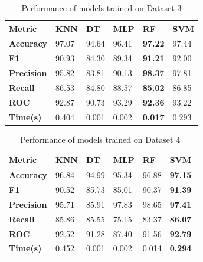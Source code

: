 \begin{table}[H]
  \centering
  \caption{Performance of models trained on Dataset 3}\label{tab:performance_of_models_trained_on_dataset_3}
  \begin{tabular}{|p{5em}|C{3em}|C{3em}|C{3em}|C{3em}|C{3em}|}
    \hline
    \textbf{Metric}    & \textbf{KNN} & \textbf{DT} & \textbf{MLP} & \textbf{RF}    & \textbf{SVM} \\
    \hline
    \textbf{Accuracy}  & 97.07        & 94.64       & 96.41        & \textbf{97.22} & 97.44        \\
    \textbf{F1}        & 90.93        & 84.30       & 89.34        & \textbf{91.21} & 92.00        \\
    \textbf{Precision} & 95.82        & 83.81       & 90.13        & \textbf{98.37} & 97.81        \\
    \textbf{Recall}    & 86.53        & 84.80       & 88.57        & \textbf{85.02} & 86.85        \\
    \textbf{ROC}       & 92.87        & 90.73       & 93.29        & \textbf{92.36} & 93.22        \\
    \textbf{Time(s)}   & 0.404        & 0.001       & 0.002        & \textbf{0.017} & 0.293        \\
    \hline
  \end{tabular}
\end{table}

\begin{table}[H]
  \centering
  \caption{Performance of models trained on Dataset 4}\label{tab:performance_of_models_trained_on_dataset_4}
  \begin{tabular}{|p{5em}|C{3em}|C{3em}|C{3em}|C{3em}|C{3em}|}
    \hline
    \textbf{Metric}    & \textbf{KNN} & \textbf{DT} & \textbf{MLP} & \textbf{RF} & \textbf{SVM}   \\
    \hline
    \textbf{Accuracy}  & 96.84        & 94.99       & 95.34        & 96.88       & \textbf{97.15} \\
    \textbf{F1}        & 90.52        & 85.73       & 85.01        & 90.37       & \textbf{91.39} \\
    \textbf{Precision} & 95.71        & 85.91       & 97.83        & 98.65       & \textbf{97.41} \\
    \textbf{Recall}    & 85.86        & 85.55       & 75.15        & 83.37       & \textbf{86.07} \\
    \textbf{ROC}       & 92.52        & 91.28       & 87.40        & 91.56       & \textbf{92.79} \\
    \textbf{Time(s)}   & 0.452        & 0.001       & 0.002        & 0.014       & \textbf{0.294} \\
    \hline
  \end{tabular}
\end{table}

